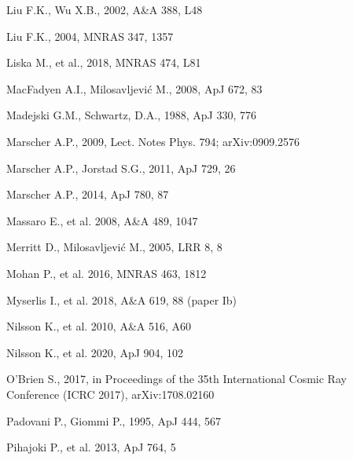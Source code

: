 \documentclass[preprints,article,accept,moreauthors,pdftex]{Definitions/mdpi}
\begin{document}
\begin{thebibliography}{999}
Liu F.K., Wu X.B., 2002, A\&A 388, L48

Liu F.K., 2004, MNRAS 347, 1357

Liska M., et al., 2018, MNRAS 474, L81

MacFadyen A.I., Milosavljevi\'c M.,  2008, ApJ 672, 83 

Madejski G.M., Schwartz, D.A., 1988, ApJ 330, 776

Marscher A.P., 2009, Lect. Notes Phys. 794; arXiv:0909.2576

Marscher A.P., Jorstad S.G., 2011, ApJ 729, 26

Marscher A.P., 2014, ApJ 780, 87

Massaro E., et al. 2008, A\&A 489, 1047

Merritt D., Milosavljevi\'c M., 2005, LRR 8, 8

Mohan P., et al. 2016, MNRAS 463, 1812

Myserlis I., et al. 2018, A\&A 619, 88 (paper Ib)

Nilsson K., et al. 2010, A\&A 516, A60 

Nilsson K., et al. 2020, ApJ 904, 102

O'Brien S., 2017, in Proceedings of the 35th International Cosmic Ray Conference (ICRC 2017), arXiv:1708.02160

Padovani P., Giommi P.,  1995, ApJ 444, 567 

Pihajoki P., et al. 2013, ApJ 764, 5


\end{thebibliography}
\end{document}
